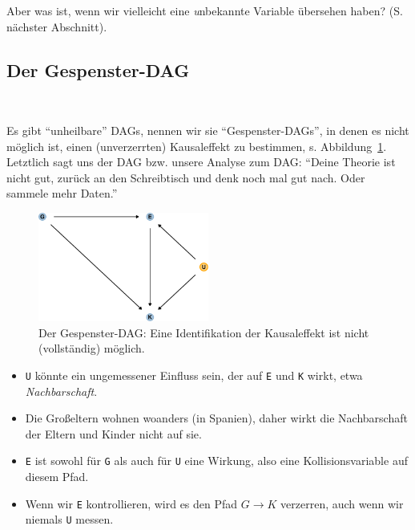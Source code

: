 \documentclass[
  a4paper,
  DIV=11]{scrreprt}
\theoremstyle{definition}
\theoremstyle{remark}
\begin{document}
Aber was ist, wenn wir vielleicht eine \emph{u}nbekannte Variable
übersehen haben? (S. nächster Abschnitt). 👻

\hypertarget{der-gespenster-dag}{%
\subsection{Der Gespenster-DAG}\label{der-gespenster-dag}}

👻

Es gibt ``unheilbare'' DAGs, nennen wir sie ``Gespenster-DAGs'', in
denen es nicht möglich ist, einen (unverzerrten) Kausaleffekt zu
bestimmen, s. Abbildung~\ref{fig-dag-ghost}. Letztlich sagt uns der DAG
bzw. unsere Analyse zum DAG: ``Deine Theorie ist nicht gut, zurück an
den Schreibtisch und denk noch mal gut nach. Oder sammele mehr Daten.''

\begin{figure}

{\centering \includegraphics[width=0.5\textwidth,height=\textheight]{./kausal_files/figure-pdf/fig-dag-ghost-1.pdf}

}

\caption{\label{fig-dag-ghost}Der Gespenster-DAG: Eine Identifikation
der Kausaleffekt ist nicht (vollständig) möglich.}

\end{figure}

\begin{itemize}
\item
  \texttt{U} könnte ein ungemessener Einfluss sein, der auf \texttt{E}
  und \texttt{K} wirkt, etwa \emph{Nachbarschaft}.
\item
  Die Großeltern wohnen woanders (in Spanien), daher wirkt die
  Nachbarschaft der Eltern und Kinder nicht auf sie.
\item
  \texttt{E} ist sowohl für \texttt{G} als auch für \texttt{U} eine
  Wirkung, also eine Kollisionsvariable auf diesem Pfad.
\item
  Wenn wir \texttt{E} kontrollieren, wird es den Pfad
  \(G \rightarrow K\) verzerren, auch wenn wir niemals \texttt{U}
  messen.
\end{itemize}
\end{document}

